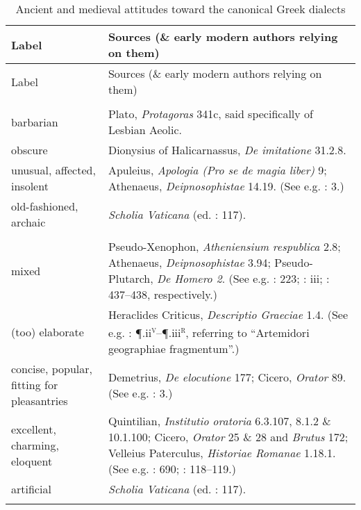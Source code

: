 \begin{longtable}{>{\raggedright\arraybackslash}p{3cm}>{\raggedright\arraybackslash}p{\textwidth - 3\tabcolsep - 3cm}}
\caption{Ancient and medieval attitudes toward the canonical Greek dialects}\label{tab:7.1}\\
\lsptoprule Label & Sources (\& early modern authors relying on them)\\\midrule\endfirsthead\midrule Label & Sources (\& early modern authors relying on them)\\\midrule\endhead\endfoot\lspbottomrule\endlastfoot
\multicolumn{2}{c}{Aeolic}\\\midrule
 barbarian & Plato, \textit{Protagoras} 341c, said specifically of Lesbian Aeolic.\\
 obscure & Dionysius of Halicarnassus, \textit{De imitatione} 31.2.8.\\
 unusual, affected, insolent & Apuleius, \textit{Apologia (Pro se de magia liber)} 9; Athenaeus, \textit{Deipnosophistae} 14.19. (See e.g. \citealt{Munthe1748}: 3.)\\
 old-fashioned, archaic & \textit{Scholia Vaticana} (ed. \citealt{Hilgard1901}: 117).\\
\midrule\multicolumn{2}{c}{Attic}\\\midrule
 mixed & Pseudo-Xenophon, \textit{Atheniensium respublica} 2.8; Athenaeus, \textit{Deipnosophistae} 3.94; Pseudo-Plutarch, \textit{De Homero 2}. (See e.g. \citealt{Schwartz1721}: 223; \citealt{Maittaire1706}: iii; \citealt{Saumaise1643a}: 437–438, respectively.)\\
 (too) elaborate & Heraclides Criticus, \textit{Descriptio Graeciae} 1.4. (See e.g. \citealt{Estienne1573}: ¶.ii\textsc{\textsuperscript{v}}–¶.iii\textsc{\textsuperscript{r}}, referring to “Artemidori geographiae fragmentum”.)\\
 concise, popular, fitting for pleasantries & Demetrius, \textit{De elocutione} 177; Cicero, \textit{Orator} 89. (See e.g. \citealt{Munthe1748}: 3.)\\
 excellent, charming, eloquent & Quintilian, \textit{Institutio oratoria} 6.3.107, 8.1.2 \& 10.1.100; Cicero, \textit{Orator} 25 \& 28 and \textit{Brutus} 172; Velleius Paterculus, \textit{Historiae Romanae} 1.18.1. (See e.g. \citealt{Duret1613}: 690; \citealt{Rollin1726}: 118–119.)\\
 artificial & \textit{Scholia Vaticana} (ed. \citealt{Hilgard1901}: 117).\\\midrule\multicolumn{2}{c}{Doric}\\\midrule

\end{longtable}
